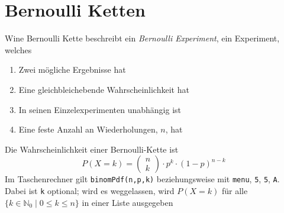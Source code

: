 \documentclass{article}
\begin{document}
\section{Bernoulli Ketten}
Wine Bernoulli Kette beschreibt ein \emph{Bernoulli Experiment}, ein Experiment, welches
\begin{enumerate}
 \item Zwei mögliche Ergebnisse hat
 \item Eine gleichbleichebende Wahrscheinlichkeit hat
 \item In seinen Einzelexperimenten unabhängig ist
 \item Eine feste Anzahl an Wiederholungen, $n$, hat 
\end{enumerate} 
Die Wahrscheinlichkeit einer Bernoulli-Kette ist
\[
 P(X=k) =
 \begin{pmatrix} n \\ k \end{pmatrix} \cdot
  p^k \cdot (1-p)^{n-k}
\]
Im Taschenrechner gilt \texttt{binomPdf(n,p,k)} beziehungsweise mit \texttt{menu}, \texttt{5}, \texttt{5}, \texttt{A}. Dabei ist \texttt{k} optional; wird es weggelassen, wird $P(X=k)$ für alle $\{k \in \mathbb{N}_0 \mid 0 \leq k \leq n\}$ in einer Liste ausgegeben
\end{document}
